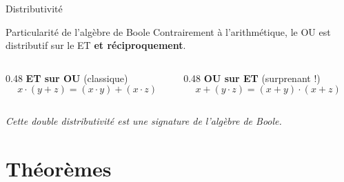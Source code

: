 \begin{frame}{Distributivité}

    \begin{alertblock}{Particularité de l'algèbre de Boole}
        Contrairement à l'arithmétique, le OU est distributif sur le ET \textbf{et réciproquement}.
    \end{alertblock}

    \vspace{0.4cm}

    \begin{columns}[T]
        \begin{column}{0.48\textwidth}
            \textbf{ET sur OU} (classique)
            \[
                x \cdot (y + z) = (x \cdot y) + (x \cdot z)
            \]
        \end{column}
        \begin{column}{0.48\textwidth}
            \textbf{OU sur ET} (surprenant !)
            \[
                x + (y \cdot z) = (x + y) \cdot (x + z)
            \]
        \end{column}
    \end{columns}

    \vspace{0.5cm}
    \centering
    \textit{Cette double distributivité est une signature de l'algèbre de Boole.}

\end{frame}

\section{Théorèmes}

